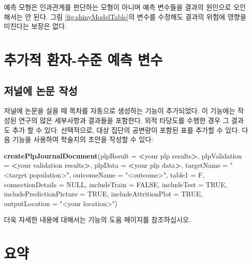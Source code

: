 \documentclass[11pt]{book}
\newenvironment{Shaded}{\begin{snugshade}}{\end{snugshade}}
\newcommand{\KeywordTok}[1]{\textcolor[rgb]{0.13,0.29,0.53}{\textbf{#1}}}
\newcommand{\DataTypeTok}[1]{\textcolor[rgb]{0.13,0.29,0.53}{#1}}
\newcommand{\StringTok}[1]{\textcolor[rgb]{0.31,0.60,0.02}{#1}}
\newcommand{\OtherTok}[1]{\textcolor[rgb]{0.56,0.35,0.01}{#1}}
\newcommand{\OperatorTok}[1]{\textcolor[rgb]{0.81,0.36,0.00}{\textbf{#1}}}
\newcommand{\NormalTok}[1]{#1}
\theoremstyle{definition}
\theoremstyle{definition}
\theoremstyle{definition}
\theoremstyle{remark}
\let\BeginKnitrBlock\begin \let\EndKnitrBlock\end
\begin{document}
\BeginKnitrBlock{rmdimportant}
예측 모형은 인과관계를 판단하는 모형이 아니며 예측 변수들을 결과의
원인으로 오인해서는 안 된다. 그림 \ref{fig:shinyModelTable}의 변수를
수정해도 결과의 위험에 영향을 미친다는 보장은 없다.
\EndKnitrBlock{rmdimportant}

\section{추가적 환자-수준 예측 변수}\label{----}

\subsection{저널에 논문 작성}\label{--}

저널에 논문을 실을 때 목차를 자동으로 생성하는 기능이 추가되었다. 이
기능에는 작성된 연구의 많은 세부사항과 결과들을 포함한다. 외적 타당도를
수행한 경우 그 결과도 추가 할 수 있다. 선택적으로, 대상 집단의 공변량이
포함된 표를 추가할 수 있다. 다음 기능을 사용하여 학술지의 초안을 작성할
수 있다:

\begin{Shaded}
\begin{Highlighting}[]
 \KeywordTok{createPlpJournalDocument}\NormalTok{(}\DataTypeTok{plpResult =} \OperatorTok{<}\NormalTok{your plp results}\OperatorTok{>}\NormalTok{,}
             \DataTypeTok{plpValidation =} \OperatorTok{<}\NormalTok{your validation results}\OperatorTok{>}\NormalTok{,}
             \DataTypeTok{plpData =} \OperatorTok{<}\NormalTok{your plp data}\OperatorTok{>}\NormalTok{,}
             \DataTypeTok{targetName =} \StringTok{"<target population>"}\NormalTok{,}
             \DataTypeTok{outcomeName =} \StringTok{"<outcome>"}\NormalTok{,}
             \DataTypeTok{table1 =}\NormalTok{ F,}
             \DataTypeTok{connectionDetails =} \OtherTok{NULL}\NormalTok{,}
             \DataTypeTok{includeTrain =} \OtherTok{FALSE}\NormalTok{,}
             \DataTypeTok{includeTest =} \OtherTok{TRUE}\NormalTok{,}
             \DataTypeTok{includePredictionPicture =} \OtherTok{TRUE}\NormalTok{,}
             \DataTypeTok{includeAttritionPlot =} \OtherTok{TRUE}\NormalTok{,}
             \DataTypeTok{outputLocation =} \StringTok{"<your location>"}\NormalTok{)}
\end{Highlighting}
\end{Shaded}

더욱 자세한 내용에 대해서는 기능의 도움 페이지를 참조하십시오.

\section{요약}\label{-11}
\end{document}

